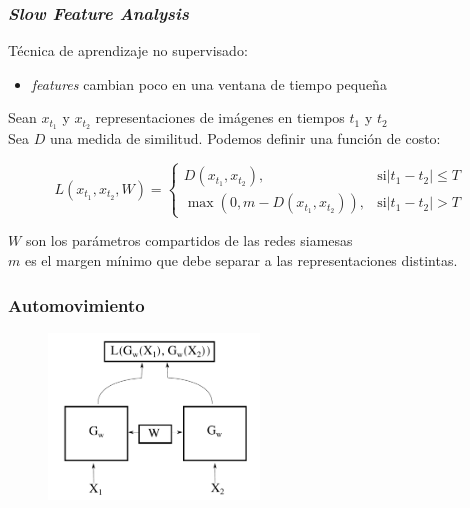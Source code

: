 \documentclass{beamer}
\begin{document}
\begin{frame}
\frametitle{\textit{Slow Feature Analysis}}

Técnica de aprendizaje no supervisado:
\begin{itemize}
    \item \textit{features} cambian poco en una ventana de tiempo pequeña \pause
	\end{itemize}

	Sean \(x_{t_1}\) y \(x_{t_2}\) representaciones de imágenes en tiempos \(t_1\) y \(t_2\)\\
Sea \(D\) una medida de similitud. Podemos definir una función de costo:

\begin{equation}
L(x_{t_1}, x_{t_2}, W) = \begin{cases}
                           D(x_{t_1}, x_{t_2}),& \text{si} |t_1 - t_2| \leq T \\ 
                           \max{(0, m - D(x_{t_1}, x_{t_2}))},& \text{si} |t_1 - t_2| > T
                         \end{cases}
\end{equation}

\(W\) son los parámetros compartidos de las redes siamesas\\
\(m\) es el margen mínimo que debe separar a las representaciones distintas.
\end{frame}





\begin{frame}
\frametitle{Automovimiento}
\begin{figure}
    \centering
    \includegraphics[width=0.5\textwidth]{images/siamese-diagram.pdf}
\end{figure}
\end{frame}
\end{document}
